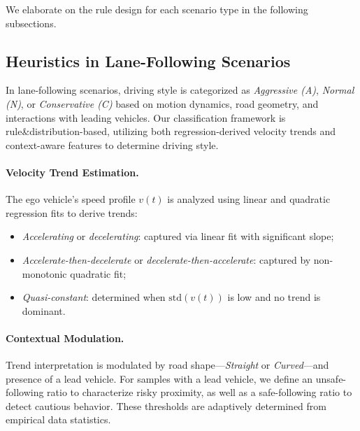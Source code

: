 \documentclass{article}
\begin{document}
We elaborate on the rule design for each scenario type in the following subsections.

\subsection{Heuristics in Lane-Following Scenarios}

In lane-following scenarios, driving style is categorized as \textit{Aggressive (A)}, \textit{Normal (N)}, or \textit{Conservative (C)} based on motion dynamics, road geometry, and interactions with leading vehicles. Our classification framework is rule\&distribution-based, utilizing both regression-derived velocity trends and context-aware features to determine driving style.

\paragraph{Velocity Trend Estimation.}
The ego vehicle's speed profile $v(t)$ is analyzed using linear and quadratic regression fits to derive trends:
\begin{itemize}[leftmargin=1em, topsep=0pt, itemsep=0.3em]
    \item \textit{Accelerating} or \textit{decelerating}: captured via linear fit with significant slope;
    \item \textit{Accelerate-then-decelerate} or \textit{decelerate-then-accelerate}: captured by non-monotonic quadratic fit;
    \item \textit{Quasi-constant}: determined when $\mathrm{std}(v(t))$ is low and no trend is dominant.
\end{itemize}

\paragraph{Contextual Modulation.}
Trend interpretation is modulated by road shape---\textit{Straight} or \textit{Curved}---and presence of a lead vehicle. For samples with a lead vehicle, we define an unsafe-following ratio to characterize risky proximity, as well as a safe-following ratio to detect cautious behavior. These thresholds are adaptively determined from empirical data statistics.
\end{document}
